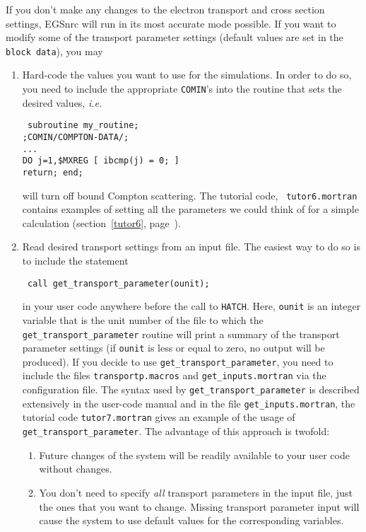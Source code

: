 If you don't make any changes to the electron transport 
and cross section settings, EGSnrc will run in its 
most accurate mode possible. If you want 
to modify some of the transport parameter settings (default values 
are set in the {\tt block data}), you may
\begin{enumerate}
\item
Hard-code the values you want to use for the simulations. 
In order to do so, you need to include the appropriate 
{\tt COMIN}'s into the routine that sets 
the desired values, {\em i.e.}
\begin{flushleft}{\tt
subroutine my\_routine; \\
;COMIN/COMPTON-DATA/; \\
...\\
DO j=1,\$MXREG [ ibcmp(j) = 0; ] \\
return; end; }
\end{flushleft}
will turn off bound Compton scattering.  The tutorial code, {\tt
tutor6.mortran} contains examples of setting all the parameters we could
think of for a simple calculation (section~\ref{tutor6},
page~\pageref{tutor6}).
\item
Read desired transport settings from an input file. 
The easiest way to do so is to include  the statement 
\begin{flushleft} {\tt
call get\_transport\_parameter(ounit); }
\end{flushleft}
in your user code anywhere before the call to {\tt HATCH}. 
Here, {\tt ounit} is an integer variable that is 
the unit number of the file to which the 
{\tt get\_transport\_parameter} routine will print a summary of 
the transport parameter settings (if {\tt ounit} is less 
or equal to zero, no output will be produced). 
If you decide to use {\tt get\_transport\_parameter}, you need 
to include the files {\tt transportp.macros} and 
{\tt get\_inputs.mortran} via the 
configuration file. The syntax used by {\tt get\_transport\_parameter} 
is described extensively in the user-code manual\cite{Ro00} and in the file 
{\tt get\_inputs.mortran}, the tutorial code 
{\tt tutor7.mortran} gives an example of the usage of 
{\tt get\_transport\_parameter}. 
The advantage of this approach is twofold:
\begin{enumerate}
\item
Future changes of the system will be readily 
available to your user code without changes.
\item
You don't need to specify {\em all} transport 
parameters in the input file, just the ones 
that you want to change. Missing transport 
parameter input will cause the system 
to use default values for the corresponding variables. 
\end{enumerate}
\end{enumerate}



